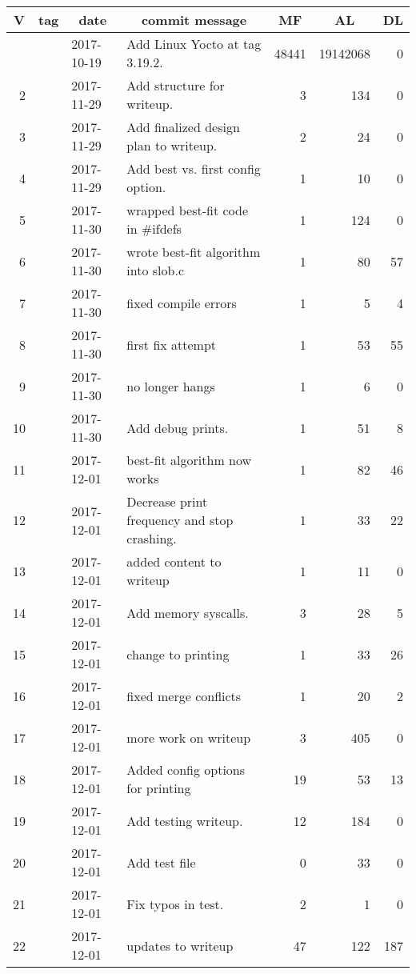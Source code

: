\documentclass[letterpaper,10pt,titlepage,draftclsnofoot,onecolumn]{article}
\begin{document}
\bigskip

\begin{longtable}{|rlllrrr|}
\hline \multicolumn{1}{|c}{\textbf{V}} & \multicolumn{1}{c}{\textbf{tag}}
& \multicolumn{1}{c}{\textbf{date}}
& \multicolumn{1}{c}{\textbf{commit message}} & \multicolumn{1}{c}{\textbf{MF}}
& \multicolumn{1}{c}{\textbf{AL}} & \multicolumn{1}{c|}{\textbf{DL}} \\ \hline
\endhead


\endfoot

\hline%
\endlastfoot

\hline 1 &  & 2017-10-19 & Add Linux Yocto at tag 3.19.2. & 48441 & 19142068 & 0 \\
\hline 2 &  & 2017-11-29 & Add structure for writeup. & 3 & 134 & 0 \\
\hline 3 &  & 2017-11-29 & Add finalized design plan to writeup. & 2 & 24 & 0 \\
\hline 4 &  & 2017-11-29 & Add best vs. first config option. & 1 & 10 & 0 \\
\hline 5 &  & 2017-11-30 & wrapped best-fit code in \#ifdefs & 1 & 124 & 0 \\
\hline 6 &  & 2017-11-30 & wrote best-fit algorithm into slob.c & 1 & 80 & 57 \\
\hline 7 &  & 2017-11-30 & fixed compile errors & 1 & 5 & 4 \\
\hline 8 &  & 2017-11-30 & first fix attempt & 1 & 53 & 55 \\
\hline 9 &  & 2017-11-30 & no longer hangs & 1 & 6 & 0 \\
\hline 10 &  & 2017-11-30 & Add debug prints. & 1 & 51 & 8 \\
\hline 11 &  & 2017-12-01 & best-fit algorithm now works & 1 & 82 & 46 \\
\hline 12 &  & 2017-12-01 & Decrease print frequency and stop crashing. & 1 & 33 & 22 \\
\hline 13 &  & 2017-12-01 & added content to writeup & 1 & 11 & 0 \\
\hline 14 &  & 2017-12-01 & Add memory syscalls. & 3 & 28 & 5 \\
\hline 15 &  & 2017-12-01 & change to printing & 1 & 33 & 26 \\
\hline 16 &  & 2017-12-01 & fixed merge conflicts & 1 & 20 & 2 \\
\hline 17 &  & 2017-12-01 & more work on writeup & 3 & 405 & 0 \\
\hline 18 &  & 2017-12-01 & Added config options for printing & 19 & 53 & 13 \\
\hline 19 &  & 2017-12-01 & Add testing writeup. & 12 & 184 & 0 \\
\hline 20 &  & 2017-12-01 & Add test file & 0 & 33 & 0 \\
\hline 21 &  & 2017-12-01 & Fix typos in test. & 2 & 1 & 0 \\
\hline 22 &  & 2017-12-01 & updates to writeup & 47 & 122 & 187
\end{longtable}
\end{document}
